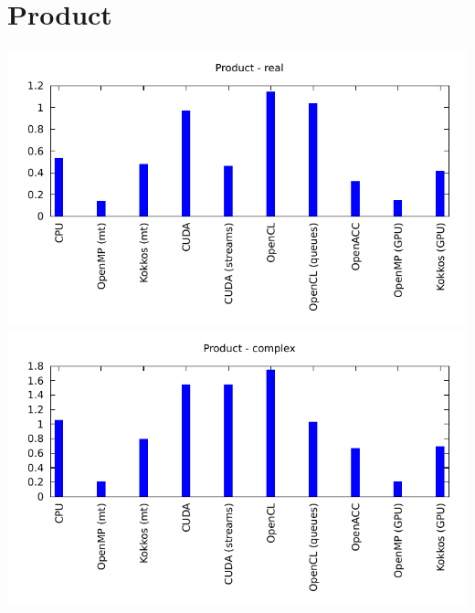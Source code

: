 \documentclass[12pt, a4paper]{article}
\begin{document}
\section{Product}
\includegraphics[height=8cm]{graphs/product-r.pdf}\\
\includegraphics[height=8cm]{graphs/product-c.pdf}\\


\end{document}
